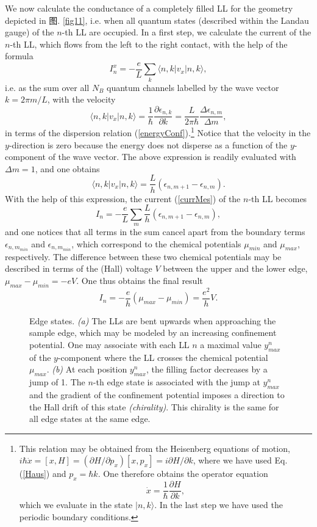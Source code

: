 \documentclass[10pt]{book}
\newcommand{\beq}{\begin{equation}}
\newcommand{\eeq}{\end{equation}}
\begin{document}
We now calculate the conductance of a completely filled LL for the geometry depicted in 图. \ref{fig11}, i.e. when all
quantum states (described within the Landau gauge) of the $n$-th LL are occupied. In a first step, we calculate the current of 
the $n$-th LL, which flows from the left to the right contact, with the help of the formula \cite{butt}
\beq\label{currMes}
I_n^x=-\frac{e}{L}\sum_k \langle n,k|v_x|n,k\rangle,
\eeq
i.e. as the sum over all $N_B$ quantum channels labelled by the wave vector $k = 2\pi m/L$, with the velocity 
$$\langle n,k|v_x|n,k\rangle = \frac{1}{\hbar}\frac{\partial \epsilon_{n,k}}{\partial k}=
\frac{L}{2\pi \hbar}\frac{\Delta \epsilon_{n,m}}{\Delta m},$$
in terms of the dispersion relation (\ref{energyConf}).\footnote{This relation may be obtained from the Heisenberg equations
of motion, $i\hbar\dot{x}=[x,H]=(\partial H/\partial p_x)[x,p_x]=i \partial H/ \partial k$, where we have used 
Eq. (\ref{Haus}) and $p_x=\hbar k$. One therefore obtains the operator equation
$$\dot{x}=\frac{1}{\hbar}\frac{\partial H}{\partial k},$$
which we evaluate in the state $|n,k\rangle$. In the last step we have used the periodic boundary conditions.} 
Notice that the velocity in the $y$-direction is zero because 
the energy does not disperse as a function of the $y$-component of the wave vector. 
The above expression is readily evaluated with $\Delta m=1$, and one obtains 
$$\langle n,k|v_x|n,k\rangle = \frac{L}{h}\left(\epsilon_{n,m+1} - \epsilon_{n,m}\right).
$$
With the help of this expression, the current (\ref{currMes}) of the $n$-th LL becomes
$$I_n= -\frac{e}{L}\sum_{m}\frac{L}{h}\left(\epsilon_{n,m+1} - \epsilon_{n,m}\right),
$$
and one notices that all terms in the sum cancel apart from the boundary terms $\epsilon_{n,m_{min}}$ and
$\epsilon_{n,m_{min}}$, which correspond to the chemical potentials $\mu_{min}$ and $\mu_{max}$, respectively.
The difference between these two chemical potentials may be described in terms of the (Hall) voltage $V$ between the 
upper and the lower edge,
$\mu_{max}-\mu_{min} = -eV$. One thus obtains the final result
\beq\label{currLL}
I_n = -\frac{e}{h}\left(\mu_{max} - \mu_{min}\right)=\frac{e^2}{h} V.
\eeq

\begin{figure}
\begin{center}
\end{center}
\caption{ Edge states. {\sl (a)} The LLs are bent upwards when approaching the sample edge, which may be modeled 
by an increasing confinement potential. One may associate with each LL $n$ a maximal value $y_{max}^n$ 
of the $y$-component where the LL crosses the chemical potential $\mu_{max}$.
{\sl (b)} At each position $y_{max}^n$, the filling factor decreases by a jump of 1. The $n$-th edge state is 
associated with the jump at $y_{max}^n$ and the gradient of the confinement potential imposes a direction 
to the Hall drift of this state {\sl (chirality)}. This chirality is the same for all edge states at the same edge.}
\label{fig12}
\end{figure}
\end{document}
